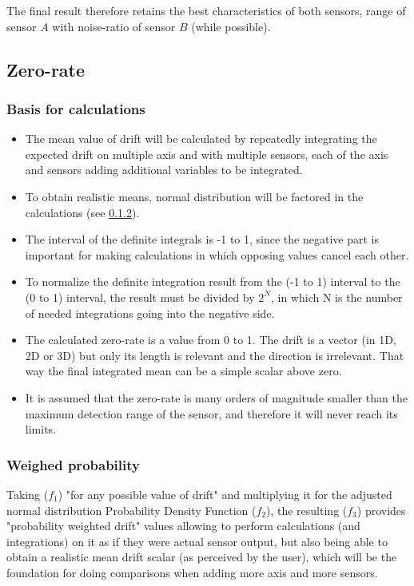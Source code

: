 \documentclass[10pt, twocolumn, a4paper]{article}
\begin{document}
        The final result therefore retains the best characteristics of both sensors, range of sensor $A$ with noise-ratio of sensor $B$ (while possible).

    \pagebreak
    \subsection{Zero-rate}
        \subsubsection{Basis for calculations}
        \begin{itemize}
            \item The mean value of drift will be calculated by repeatedly integrating the expected drift on multiple axis and with multiple sensors, each of the axis and sensors adding additional variables to be integrated.
            \item To obtain realistic means, normal distribution will be factored in the calculations (see \ref{solution.rate.pdf}).
            \item The interval of the definite integrals is -1 to 1, since the negative part is important for making calculations in which opposing values cancel each other.
            \item To normalize the definite integration result from the (-1 to 1) interval to the (0 to 1) interval, the result must be divided by $ 2^N $, in which N is the number of needed integrations going into the negative side.
            \item The calculated zero-rate is a value from 0 to 1. The drift is a vector (in 1D, 2D or 3D) but only its length is relevant and the direction is irrelevant. That way the final integrated mean can be a simple scalar above zero.
            \item It is assumed that the zero-rate is many orders of magnitude smaller than the maximum detection range of the sensor, and therefore it will never reach its limits.
        \end{itemize}

        \subsubsection{Weighed probability}
        \label{solution.rate.pdf}
            Taking ($f_1$) "for any possible value of drift" and multiplying it for the adjusted normal distribution Probability Density Function ($f_2$), the resulting ($f_3$) provides "probability weighted drift" values allowing to perform calculations (and integrations) on it as if they were actual sensor output, but  also being able to obtain a realistic mean drift scalar (as perceived by the user), which will be the foundation for doing comparisons when adding more axis and more sensors.
\end{document}
